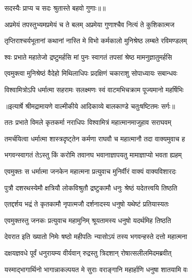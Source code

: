{सदस्यैः प्राप्य च सदः श्रुतास्ते बहवो गुणाः॥॥} %

\addtocounter{shlokacount}{1}

\twolineshloka
{अप्रमेयं तपस्तुभ्यमप्रमेयं च ते बलम्}
{अप्रमेया गुणाश्चैव नित्यं ते कुशिकात्मज} %

\twolineshloka
{तृप्तिराश्चर्यभूतानां कथानां नास्ति मे विभो}
{कर्मकालो मुनिश्रेष्ठ लम्बते रविमण्डलम्} %

\twolineshloka
{श्वः प्रभाते महातेजो द्रष्टुमर्हसि मां पुनः}
{स्वागतं तपसां श्रेष्ठ मामनुज्ञातुमर्हसि} %

\twolineshloka
{एवमुक्त्वा मुनिश्रेष्ठं वैदेहो मिथिलाधिपः}
{प्रदक्षिणं चकाराशु सोपाध्यायः सबान्धवः} %

\twolineshloka
{विश्वामित्रोऽपि धर्मात्मा सहरामः सलक्ष्मणः}
{स्वं वाटमभिचक्राम पूज्यमानो महर्षिभिः} %


{॥इत्यार्षे श्रीमद्रामायणे वाल्मीकीये आदिकाव्ये बालकाण्डे चतुःषष्टितमः सर्गः॥}


\twolineshloka
{ततः प्रभाते विमले कृतकर्मा नराधिपः}
{विश्वामित्रं महात्मानमाजुहाव सराघवम्} %

\twolineshloka
{तमर्चयित्वा धर्मात्मा शास्त्रदृष्ट्तेन कर्मणा}
{राघवौ च महात्मानौ तदा वाक्यमुवाच ह} %

\twolineshloka
{भगवन्स्वागतं तेऽस्तु किं करोमि तवानघ}
{भवानाज्ञापयतु मामाज्ञाप्यो भवता ह्यहम्} %

\twolineshloka
{एवमुक्तः स धर्मात्मा जनकेन महात्मना}
{प्रत्युवाच मुनिर्वीरं वाक्यं वाक्यविशारदः} %

\twolineshloka
{पुत्रौ दशरथस्येमौ क्षत्रियौ लोकविश्रुतौ}
{द्रष्टुकामौ धनुः श्रेष्ठं यदेतत्त्वयि तिष्ठति} %

\twolineshloka
{एतद्दर्शय भद्रं ते कृतकामौ नृपात्मजौ}
{दर्शनादस्य धनुषो यथेष्टं प्रतियास्यतः} %

\twolineshloka
{एवमुक्तस्तु जनकः प्रत्युवाच महामुनिम्}
{श्रूयतामस्य धनुषो यदर्थमिह तिष्ठति} %

\twolineshloka
{देवरात इति ख्यातो निमेः षष्ठो महीपतिः}
{न्यासोऽयं तस्य भगवन्हस्ते दत्तो महात्मना} %

\twolineshloka
{दक्षयज्ञवधे पूर्वं धनुरायम्य वीर्यवान्}
{रुद्रस्तु त्रिदशान् रोषात्सलीलमिदमब्रवीत्} %

\twolineshloka
{यस्माद्भागार्थिनो भागान्नाकल्पयत मे सुराः}
{वराङ्गानि महार्हाणि धनुषा शातयामि वः} %

